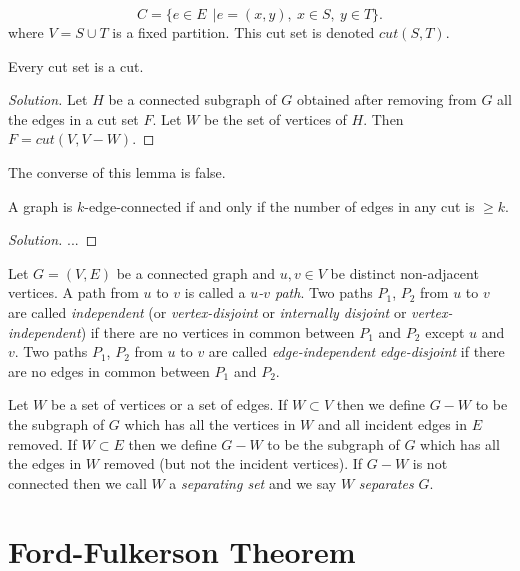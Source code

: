 \[
C=\{e\in E\ \ | e=(x,y), \ x\in S,\ y\in T\}.
\]
where $V=S\cup T$ is a fixed partition.
This cut set is denoted $cut(S,T)$.

\begin{lemma}
{\rm
Every cut set is a cut.
}
\end{lemma}

\begin{proof}[Solution]
Let $H$ be a connected subgraph of $G$ obtained after removing from
$G$ all the edges in a cut set $F$. Let $W$ be the set of vertices
of $H$. Then $F=cut(V,V-W)$.
\end{proof}

The converse of this lemma is false.

\begin{theorem}
{\rm
A graph is $k$-edge-connected if and only if the number of
edges in any cut is $\geq k$.
}
\end{theorem}

\begin{proof}[Solution]

...

\end{proof}


Let $G=(V,E)$ be a connected graph and $u,v\in V$ be distinct non-adjacent
vertices. A path from $u$ to $v$ is called a
{\it $u$-$v$ path}.
Two paths $P_1$, $P_2$ from $u$ to $v$ are called {\it independent}
(or {\it vertex-disjoint} or {\it internally disjoint} or
{\it vertex-independent}) if there are no vertices
in common between $P_1$ and $P_2$ except $u$ and $v$.
Two paths $P_1$, $P_2$ from $u$ to $v$ are called
{\it edge-independent}
{\it edge-disjoint}
if there are no edges
in common between $P_1$ and $P_2$.


Let $W$ be a set of vertices or a set of edges.
If $W\subset V$ then we define $G-W$ to be the subgraph
of $G$ which has all the vertices in $W$ and all incident
edges in $E$ removed.  If $W\subset E$ then we define $G-W$ to be the subgraph
of $G$ which has all the edges in $W$ removed
(but not the incident vertices).
If $G-W$ is not connected then we call $W$ a
{\it separating set} and we say $W$ {\it separates} $G$.

\section{Ford-Fulkerson Theorem}


